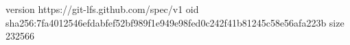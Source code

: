 version https://git-lfs.github.com/spec/v1
oid sha256:7fa4012546efdabfef52bf989f1e949e98fed0c242f41b81245c58e56afa223b
size 232566
